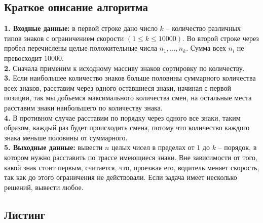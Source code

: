 \documentclass[a5paper, 10pt]{article}
\theoremstyle{definition}
\theoremstyle{plain}
\theoremstyle{remark}
\begin{document}
\subsection{Краткое описание алгоритма}
\textbf{1. Входные данные:} в первой строке дано число $k$ -- количество различных типов знаков с ограничением скорости $(1 \leq k \leq 10000)$. Во второй строке через пробел перечислены целые положительные числа $n_1, \ldots , n_k$. Сумма всех $n_i$ не превосходит 10000.\\
\textbf{2.} Сначала применим к исходному массиву знаков сортировку по количеству.\\
\textbf{3.}  Если наибольшее количество знаков больше половины суммарного количества всех знаков, расставим через одного оставшиеся знаки, начиная с первой позиции, так мы добьемся максимального количества смен, на остальные места расставим знаки наибольшего по количеству знака.\\
\textbf{4.} В противном случае расставим по порядку через одного все знаки, таким образом, каждый раз будет происходить смена, потому что количество каждого знака меньше половины от суммарного. \\
\textbf{5.  Выходные данные:} вывести $n$ целых чисел в пределах от $1$ до $k$ -- порядок, в котором нужно расставить по трассе имеющиеся знаки. Вне зависимости от того, какой знак стоит первым, считается, что, проезжая его, водитель меняет скорость, так как до этого ограничения не действовали. Если задача имеет несколько решений, вывести любое.

\subsection{Листинг}
\end{document}
